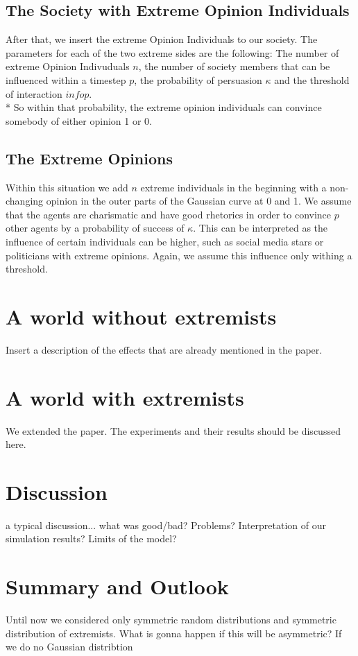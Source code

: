 \documentclass[11pt]{article}
\begin{document}
\subsection{The Society with Extreme Opinion Individuals}
After that, we insert the extreme Opinion Individuals to our society. The parameters for each of the two extreme sides are the following: The number of extreme Opinion Indivuduals $n$, the number of society members that can be influenced within a timestep $p$, the probability of persuasion $\kappa$ and the threshold of interaction $infop$. \\*
So within that probability, the extreme opinion individuals can convince somebody of either opinion 1 or 0.

\subsection{The Extreme Opinions}
Within this situation we add $n$ extreme individuals in the beginning with a non-changing opinion in the outer parts of the Gaussian curve at 0 and 1. We assume that the agents are charismatic and have good rhetorics in order to convince $p$ other agents by a probability of success of $\kappa$. This can be interpreted as the influence of certain individuals can be higher, such as social media stars or politicians with extreme opinions. Again, we assume this influence only withing a threshold.

\section{A world without extremists}
Insert a description of the effects that are already mentioned in the paper.

\section{A world with extremists}
We extended the paper. The experiments and their results should be discussed here.

\section{Discussion}
a typical discussion... what was good/bad? Problems? Interpretation of our simulation results? Limits of the model?

\section{Summary and Outlook}
Until now we considered only symmetric random distributions and symmetric distribution of extremists. What is gonna happen if this will be asymmetric?
If we do no Gaussian distribtion
\end{document}
